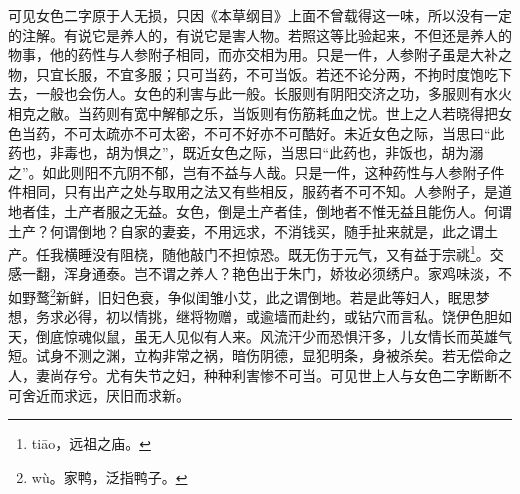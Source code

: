 \documentclass[a4paper,12pt,UTF8,twoside]{ctexbook}
\begin{document}
可见女色二字原于人无损，只因《本草纲目》上面不曾载得这一味，所以没有一定的注解。有说它是养人的，有说它是害人物。若照这等比验起来，不但还是养人的物事，他的药性与人参附子相同，而亦交相为用。只是一件，人参附子虽是大补之物，只宜长服，不宜多服；只可当药，不可当饭。若还不论分两，不拘时度饱吃下去，一般也会伤人。女色的利害与此一般。长服则有阴阳交济之功，多服则有水火相克之敝。当药则有宽中解郁之乐，当饭则有伤筋耗血之忧。世上之人若晓得把女色当药，不可太疏亦不可太密，不可不好亦不可酷好。未近女色之际，当思曰“此药也，非毒也，胡为惧之”，既近女色之际，当思曰“此药也，非饭也，胡为溺之”。如此则阳不亢阴不郁，岂有不益与人哉。只是一件，这种药性与人参附子件件相同，只有出产之处与取用之法又有些相反，服药者不可不知。人参附子，是道地者佳，土产者服之无益。女色，倒是土产者佳，倒地者不惟无益且能伤人。何谓土产？何谓倒地？自家的妻妾，不用远求，不消钱买，随手扯来就是，此之谓土产。任我横睡没有阻桡，随他敲门不担惊恐。既无伤于元气，又有益于宗祧\footnote{ti\=ao，远祖之庙。}。交感一翻，浑身通泰。岂不谓之养人？艳色出于朱门，娇妆必须绣户。家鸡味淡，不如野鹜\footnote{w\`u。家鸭，泛指鸭子。}新鲜，旧妇色衰，争似闺雏小艾，此之谓倒地。若是此等妇人，眠思梦想，务求必得，初以情挑，继将物赠，或逾墙而赴约，或钻穴而言私。饶伊色胆如天，倒底惊魂似鼠，虽无人见似有人来。风流汗少而恐惧汗多，儿女情长而英雄气短。试身不测之渊，立构非常之祸，暗伤阴德，显犯明条，身被杀矣。若无偿命之人，妻尚存兮。尤有失节之妇，种种利害惨不可当。可见世上人与女色二字断断不可舍近而求远，厌旧而求新。
\end{document}
